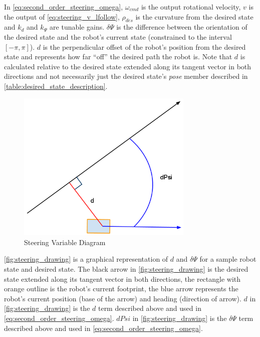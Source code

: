 In \eqref{eq:second_order_steering_omega}, $\omega_{cmd}$ is the output rotational velocity, $v$ is the output of \eqref{eq:steering_v_lfollow}, $\rho_{des}$ is the curvature from the desired state and $k_d$ and $k_{\Psi}$ are tunable gains. $\delta\Psi$ is the difference between the orientation of the desired state and the robot's current state (constrained to the interval $\left[-\pi,\pi\right]$). $d$ is the perpendicular offset of the robot's position from the desired state and represents how far ``off'' the desired path the robot is. Note that $d$ is calculated relative to the desired state extended along its tangent vector in both directions and not necessarily just the desired state's \emph{pose} member described in \autoref{table:desired_state_description}. 

\begin{figure}
\centering
\includegraphics[width=0.75\textwidth]{images/steering_drawing}
\caption{Steering Variable Diagram \label{fig:steering_drawing}}
\end{figure}

\autoref{fig:steering_drawing} is a graphical representation of $d$ and $\delta\Psi$ for a sample robot state and desired state. The black arrow in \autoref{fig:steering_drawing} is the desired state extended along its tangent vector in both directions, the rectangle with orange outline is the robot's current footprint, the blue arrow represents the robot's current position (base of the arrow) and heading (direction of arrow). $d$ in \autoref{fig:steering_drawing} is the $d$ term described above and used in \eqref{eq:second_order_steering_omega}. $dPsi$ in \autoref{fig:steering_drawing} is the $\delta\Psi$ term described above and used in \eqref{eq:second_order_steering_omega}.

